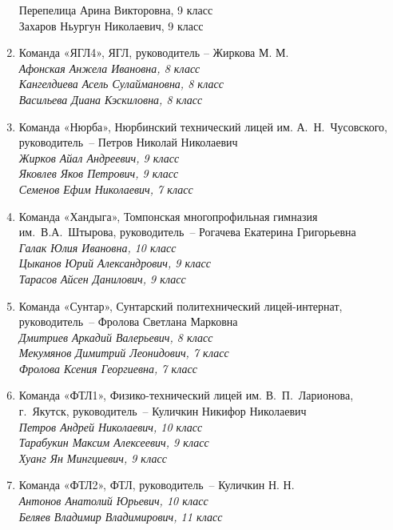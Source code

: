 \begin{enumerate}
\indent Перепелица Арина Викторовна, 9 класс\\
\indent Захаров Ньургун Николаевич, 9 класс
\rm
\item
Команда «ЯГЛ4», ЯГЛ, руководитель – Жиркова М. М.\\
\it
\indent Афонская Анжела Ивановна, 8 класс\\
\indent Кангелдиева Асель Сулаймановна, 8 класс\\
\indent Васильева Диана Кэскиловна, 8 класс
\rm
\item
Команда «Нюрба», Нюрбинский технический лицей им. А.~Н.~Чусовского, руководитель~– Петров Николай Николаевич\\
\it
\indent Жирков Айал Андреевич, 9 класс\\
\indent Яковлев Яков Петрович, 9 класс\\
\indent Семенов Ефим Николаевич, 7 класс
\rm
\item
Команда «Хандыга», Томпонская многопрофильная гимназия \\им.~В.А.~Штырова, руководитель~– Рогачева Екатерина Григорьевна\\
\it
\indent Галак Юлия Ивановна, 10 класс\\
\indent Цыканов Юрий Александрович, 9 класс\\
\indent Тарасов Айсен Данилович, 9 класс
\rm
\item
Команда «Сунтар», Сунтарский политехнический лицей-интернат, \\руководитель~– Фролова Светлана Марковна\\
\it
\indent Дмитриев Аркадий Валерьевич, 8 класс\\
\indent Мекумянов Димитрий Леонидович, 7 класс\\
\indent Фролова Ксения Георгиевна, 7 класс
\rm
\item
Команда «ФТЛ1», Физико-технический лицей им. В.~П.~Ларионова, \\
г.~Якутск, руководитель~– Куличкин Никифор Николаевич\\
\it
\indent Петров Андрей Николаевич, 10 класс\\
\indent Тарабукин Максим Алексеевич, 9 класс\\
\indent Хуанг Ян Мингциевич, 9 класс
\rm
\item
Команда «ФТЛ2»,	ФТЛ, руководитель~– Куличкин Н. Н.\\
\it
\indent Антонов Анатолий Юрьевич, 10 класс\\
\indent Беляев Владимир Владимирович, 11 класс\\

\end{enumerate}
